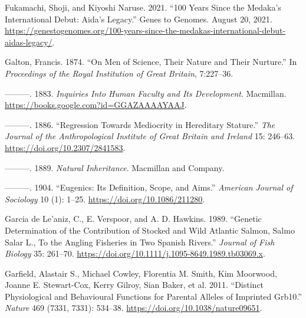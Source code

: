 \documentclass[
]{book}
\newlength{\cslhangindent}
\newlength{\cslentryspacingunit} %
\newenvironment{CSLReferences}[2] %
 {%
  \setlength{\parindent}{0pt}
  \ifodd #1
  \let\oldpar\par
  \def\par{\hangindent=\cslhangindent\oldpar}
  \fi
  \setlength{\parskip}{#2\cslentryspacingunit}
 }%
 {}
\begin{document}
\begin{CSLReferences}{1}{0}
\leavevmode{}%
Fukamachi, Shoji, and Kiyoshi Naruse. 2021. {``100 Years Since the Medaka's International Debut: {Aida}'s Legacy.''} {Genes to Genomes}. August 20, 2021. \url{https://genestogenomes.org/100-years-since-the-medakas-international-debut-aidas-legacy/}.

\leavevmode{}%
Galton, Francis. 1874. {``On {Men} of {Science}, Their {Nature} and Their {Nurture}.''} In \emph{Proceedings of the {Royal Institution} of {Great Britain}}, 7:227--36.

\leavevmode{}%
---------. 1883. \emph{Inquiries {Into Human Faculty} and {Its Development}}. {Macmillan}. \url{https://books.google.com?id=GGAZAAAAYAAJ}.

\leavevmode{}%
---------. 1886. {``Regression {Towards Mediocrity} in {Hereditary Stature}.''} \emph{The Journal of the Anthropological Institute of Great Britain and Ireland} 15: 246--63. \url{https://doi.org/10.2307/2841583}.

\leavevmode{}%
---------. 1889. \emph{Natural Inheritance}. {Macmillan and Company}.

\leavevmode{}%
---------. 1904. {``Eugenics: {Its Definition}, {Scope}, and {Aims}.''} \emph{American Journal of Sociology} 10 (1): 1--25. \url{https://doi.org/10.1086/211280}.

\leavevmode{}%
Garcia de Le'aniz, C., E. Verspoor, and A. D. Hawkins. 1989. {``Genetic Determination of the Contribution of Stocked and Wild {Atlantic} Salmon, {Salmo} Salar {L}., To the Angling Fisheries in Two {Spanish} Rivers.''} \emph{Journal of Fish Biology} 35: 261--70. \url{https://doi.org/10.1111/j.1095-8649.1989.tb03069.x}.

\leavevmode{}%
Garfield, Alastair S., Michael Cowley, Florentia M. Smith, Kim Moorwood, Joanne E. Stewart-Cox, Kerry Gilroy, Sian Baker, et al. 2011. {``Distinct Physiological and Behavioural Functions for Parental Alleles of Imprinted {Grb10}.''} \emph{Nature} 469 (7331, 7331): 534--38. \url{https://doi.org/10.1038/nature09651}.


\end{CSLReferences}
\end{document}
